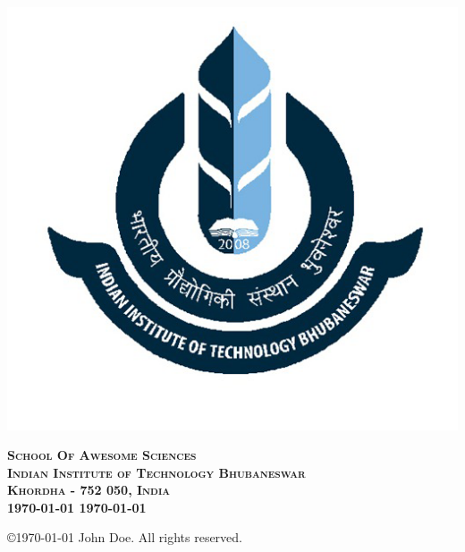 \begin{titlepage}
\begin{center}
\includegraphics[scale=0.3]{iitbbs}
\vspace*{0.5cm}

\textsc{\Large \bfseries{School Of Awesome Sciences\\
Indian Institute of Technology Bhubaneswar\\
Khordha - 752 050, India\\}}
{\Large \bfseries{\thismonth\today} {\thisyear\today}\\}
\vspace*{0.1cm}

\copyright {\thisyear\today} John Doe. All rights reserved.
\end{center}
\end{titlepage}

\newpage\null\newpage
